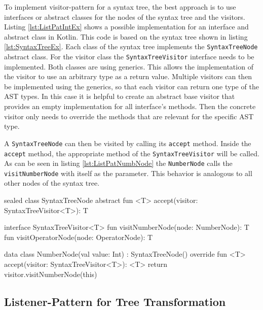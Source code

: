 To implement visitor-pattern for a syntax tree, the best approach is to use interfaces or abstract classes for the nodes of the syntax tree and the visitors. Listing \ref{lst:ListPatIntEx} shows a possible implementation for an interface and abstract class in Kotlin. This code is based on the syntax tree shown in listing \ref{lst:SyntaxTreeEx}. Each class of the syntax tree implements the \texttt{SyntaxTreeNode} abstract class. For the visitor class the \texttt{SyntaxTreeVisitor} interface needs to be implemented. Both classes are using generics. This allows the implementation of the visitor to use an arbitrary type as a return value. Multiple visitors can then be implemented using the generics, so that each visitor can return one type of the AST types. In this case it is helpful to create an abstract base visitor that provides an empty implementation for all interface's methods. Then the concrete visitor only needs to override the methods that are relevant for the specific AST type.  

A \texttt{SyntaxTreeNode} can then be visited by calling its \texttt{accept} method. Inside the \texttt{accept} method, the appropriate method of the \texttt{SyntaxTreeVisitor} will be called. As can be seen in listing \ref{lst:ListPatNumbNode} the \texttt{NumberNode} calls the \texttt{visitNumberNode} with itself as the parameter. This behavior is analogous to all other nodes of the syntax tree. 


\begin{KotlinCode}[float,numbers=none,caption=Interface and abstract class used to implement the visitor-pattern., label=lst:ListPatIntEx]
sealed class SyntaxTreeNode {
    abstract fun <T> accept(visitor: SyntaxTreeVisitor<T>): T
}

interface SyntaxTreeVisitor<T> {
    fun visitNumberNode(node: NumberNode): T
    fun visitOperatorNode(node: OperatorNode): T
}
\end{KotlinCode}


\begin{KotlinCode}[float,numbers=none,caption=Implementation of the \texttt{NumberNode} class inheriting from the \texttt{SyntaxTreeNode}., label=lst:ListPatNumbNode]
  data class NumberNode(val value: Int) : SyntaxTreeNode() {
    override fun <T> accept(visitor: SyntaxTreeVisitor<T>): <T> {
        return visitor.visitNumberNode(this)
    }
}
  \end{KotlinCode}


\subsection{Listener-Pattern for Tree Transformation}

